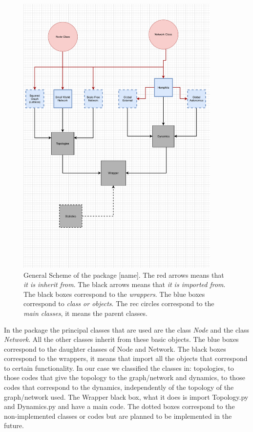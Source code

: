 \documentclass{article}
\begin{document}
\begin{figure}
    \centering
    \includegraphics[width=0.9\textwidth]{DiagramPackage.pdf}
    \caption{General Scheme of the package [name]. The red arrows means that \textit{it is inherit from}. The black arrows means that \textit{it is imported from}. The black boxes correspond to the \textit{wrappers}. The blue boxes correspond to \textit{class or objects}. The rec circles correspond to the \textit{main classes}, it means the parent classes.}
    \label{scheme}
\end{figure}

In the package the principal classes that are used are the class \textit{Node} and the class \textit{Network}. All the other classes inherit from these basic objects. The blue boxes correspond to the daughter classes of Node and Network. The black boxes correspond to the wrappers, it means that import all the objects that correspond to certain functionality. In our case we classified the classes in: topologies, to those codes that give the topology to the graph/network and dynamics, to those codes that correspond to the dynamics, independently of the topology of the graph/network used. The Wrapper black box, what it does is import Topology.py and Dynamics.py and have a main code. The dotted boxes correspond to the non-implemented classes or codes but are planned to be implemented in the future. 
\end{document}
